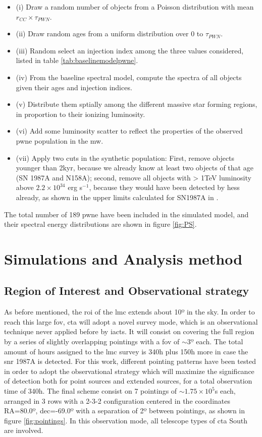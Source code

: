 \documentclass[main.tex]{subfiles}
\begin{document}
\begin{itemize}
\item (i) Draw a random number of objects from a Poisson distribution with mean $r_{CC} \times \tau_{PWN}$.
\item (ii) Draw random ages from a uniform distribution over 0 to $\tau_{PWN}$.
\item(iii) Random select an injection index among the three values considered, listed in table \ref{tab:baselinemodelpwne}.
\item (iv) From the baseline spectral model, compute the spectra of all objects given their ages and injection indices.
\item (v) Distribute them sptially among the different massive star forming regions, in proportion to their ionizing luminosity.
\item(vi) Add some luminosity scatter to reflect the properties of the observed \gls{pwne} population in the \gls{mw}.
  \item(vii) Apply two cuts in the synthetic population: First, remove objects younger than 2kyr, because we already know at least two objects of that age (SN 1987A and N158A); second, remove all objects with > 1TeV luminosity above $2.2 \times 10^{34}$ erg s$^{-1}$, because they would have been detected by \gls{hess} already, as shown in the upper limits calculated for SN1987A in \cite{2012HESSLMC}. 
\end{itemize}

The total number of 189 \gls{pwne} have been included in the simulated model, and their spectral energy distributions are shown in figure \ref{fig:PS}.

\section{Simulations and Analysis method} \label{sec:simana}

\subsection{Region of Interest and Observational strategy}

As before mentioned, the  \gls{roi} of the \gls{lmc} extends about 10º in the sky. In order to reach this large \gls{fov}, \gls{cta} will adopt a novel survey mode, which is an observational technique never applied before by \glspl{iact}. It will consist on covering the full region by a series of slightly overlapping pointings with a \gls{fov} of $\sim 3º$ each. The total amount of hours assigned to the \gls{lmc} survey is 340h plus 150h more in case the \gls{snr} 1987A is detected. For this work, different pointing patterns have been tested in order to adopt the observational strategy which will maximize the significance of detection both for point sources and extended sources, for a total observation time of 340h. The final scheme consist on 7 pointings of $\sim 1.75 \times 10^5$s each, arranged in 3 rows with a 2-3-2 configuration centered in the coordinates RA=80.0º, dec=-69.0º with a separation of 2º between pointings, as shown in figure \ref{fig:pointings}. In this observation mode, all telescope types of \gls{cta} South are involved.
\end{document}
